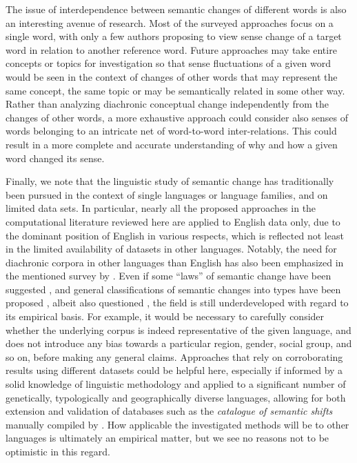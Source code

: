 \documentclass[output=paper]{langsci/langscibook}
\begin{document}
The issue of interdependence between semantic changes of different words is also an interesting avenue of research. Most of the surveyed approaches focus on a single word, with only a few authors proposing to view sense change of a target word in relation to another reference word. Future approaches may take entire concepts or topics for investigation so that sense fluctuations of a given word would be seen in the context of changes of other words that may represent the same concept, the same topic or may be semantically related in some other way. Rather than analyzing diachronic conceptual change independently from the changes of other words, a more exhaustive approach could consider also senses of words belonging to an intricate net of word-to-word inter-relations. This could result in a more complete and accurate understanding of why and how a given word changed its sense.

Finally, we note that the linguistic study of semantic change has
traditionally been pursued in the context of single languages or
language families, and on limited data sets. In particular, nearly all the proposed approaches in the computational literature reviewed here are applied to English data only, due to the dominant position of English in various respects, which is reflected not least in the limited availability of datasets in other languages. Notably, the need for diachronic corpora in other languages than English has also been emphasized in the mentioned survey by \citet{tang-2018}.
Even if some ``laws'' of semantic change have been suggested \citep[e.g.,][]{wilkins,traugott2001regularity}, and general classifications of semantic changes into types have been proposed \citep[see][]{urban-2015}, albeit also questioned \citep[see][]{fortson-2003}, the field is still underdeveloped with regard to its empirical basis. For example, it would be necessary to carefully consider whether the underlying corpus is indeed representative of the given language, and does not introduce any bias towards a particular region, gender, social group, and so on, before making any general claims. Approaches that rely on corroborating results using different datasets could be helpful here, especially if informed by a solid knowledge of linguistic methodology and applied to a significant number of genetically, typologically and geographically diverse languages, allowing for both extension and validation of databases such as the \emph{catalogue of semantic shifts} manually compiled by \citet{zalizniak-etal-2012}. How applicable the investigated methods will be to other languages is ultimately an empirical matter, but we see no reasons not to be optimistic in this regard.
\end{document}
